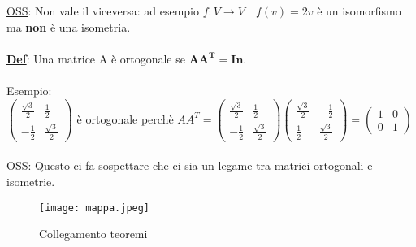 \documentclass[12pt]{article}
\begin{document}
\noindent\underline{OSS}: Non vale il viceversa: ad esempio $f:V\rightarrow V\quad f(v) = 2v$ è un isomorfismo ma \textbf{non} è una isometria.\\\\
\textbf{\underline{Def}}: Una matrice A è ortogonale se $\boldsymbol{AA^T = In}$.\\\\
Esempio:\\
$\begin{pmatrix}
    \frac{\sqrt{3}}{2} & \frac{1}{2}\\
    -\frac{1}{2} & \frac{\sqrt{3}}{2}
\end{pmatrix}$ è ortogonale perchè $AA^T = \begin{pmatrix}
    \frac{\sqrt{3}}{2} & \frac{1}{2}\\
    -\frac{1}{2} & \frac{\sqrt{3}}{2}
\end{pmatrix} \begin{pmatrix}
    \frac{\sqrt{3}}{2} & -\frac{1}{2}\\
    \frac{1}{2} & \frac{\sqrt{3}}{2}
\end{pmatrix} = \begin{pmatrix}
    1 & 0\\
    0 & 1
\end{pmatrix} $\\\\
\underline{OSS}: Questo ci fa sospettare che ci sia un legame tra matrici ortogonali e isometrie.\\
\begin{figure}[!h]
    \centering
    \texttt{[image: mappa.jpeg]}
    \caption{Collegamento teoremi}
    \label{mappa_teoremi}
\end{figure}
\end{document}
